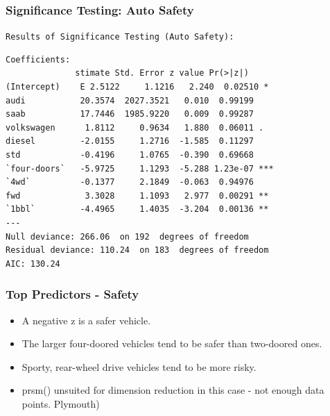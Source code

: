 \documentclass{beamer}
\begin{document}
\begin{frame}[fragile]
\frametitle{Significance Testing: Auto Safety}

\texttt{Results of Significance Testing (Auto Safety):}\\
\tiny{
\begin{verbatim}
Coefficients:
              stimate Std. Error z value Pr(>|z|)    
(Intercept)    E 2.5122     1.1216   2.240  0.02510 *  
audi           20.3574  2027.3521   0.010  0.99199    
saab           17.7446  1985.9220   0.009  0.99287    
volkswagen      1.8112     0.9634   1.880  0.06011 .  
diesel         -2.0155     1.2716  -1.585  0.11297    
std            -0.4196     1.0765  -0.390  0.69668    
`four-doors`   -5.9725     1.1293  -5.288 1.23e-07 ***
`4wd`          -0.1377     2.1849  -0.063  0.94976    
fwd             3.3028     1.1093   2.977  0.00291 ** 
`1bbl`         -4.4965     1.4035  -3.204  0.00136 ** 
---
Null deviance: 266.06  on 192  degrees of freedom
Residual deviance: 110.24  on 183  degrees of freedom
AIC: 130.24
\end{verbatim}
}
\end{frame}

\begin{frame}
\frametitle{Top Predictors - Safety}
\begin{itemize}
  \item A negative z is a safer vehicle.
  \item The larger four-doored vehicles tend to be safer than two-doored ones.
  \item Sporty, rear-wheel drive vehicles tend to be more risky.
  \item prsm() unsuited for dimension reduction in this case - not enough data points. Plymouth)
\end{itemize}
\end{frame}

\author[Q \& A]{
Christopher Patton, \texttt{cjpatton@ucdavis.edu}\\
Alex Rumbaugh, \texttt{aprumbaugh@ucdavis.edu}\\
Thomas Provan,\texttt{tcprovan@ucdavis.edu}\\
Olga Prilepova, \texttt{prilepova@gmail.com}\\
John Chen, \texttt{jhochen@ucdavis.edu}}

\begin{frame}
\titlepage
\end{frame}
\end{document}
